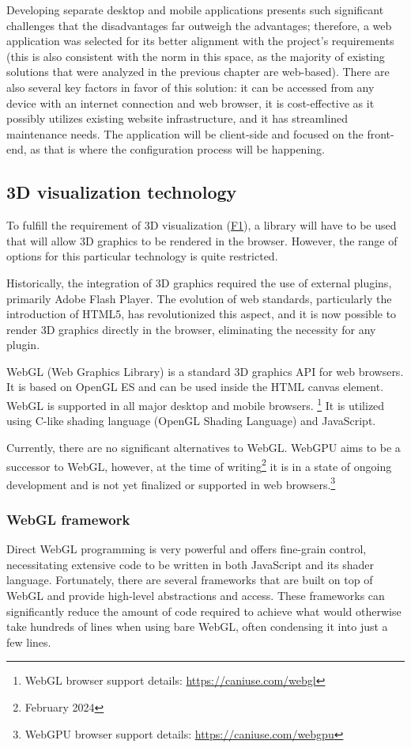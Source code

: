 Developing separate desktop and mobile applications presents such significant challenges that the disadvantages far outweigh the advantages; therefore, a web application was selected for its better alignment with the project's requirements (this is also consistent with the norm in this space, as the majority of existing solutions that were analyzed in the previous chapter are web-based). There are also several key factors in favor of this solution: it can be accessed from any device with an internet connection and web browser, it is cost-effective as it possibly utilizes existing website infrastructure, and it has streamlined maintenance needs. The application will be client-side and focused on the front-end, as that is where the configuration process will be happening.



\subsection{3D visualization technology}

To fulfill the requirement of 3D visualization (\hyperref[itm:F1]{F1}), a library will have to be used that will allow 3D graphics to be rendered in the browser. However, the range of options for this particular technology is quite restricted.

Historically, the integration of 3D graphics required the use of external plugins, primarily Adobe Flash Player. The evolution of web standards, particularly the introduction of HTML5, has revolutionized this aspect, and it is now possible to render 3D graphics directly in the browser, eliminating the necessity for any plugin. \cite{Parisi2014}

WebGL (Web Graphics Library) is a standard 3D graphics API for web browsers. It is based on OpenGL ES and can be used inside the HTML canvas element. WebGL is supported in all major desktop and mobile browsers. \footnote{WebGL browser support details: \url{https://caniuse.com/webgl}} It is utilized using C-like shading language (OpenGL Shading Language) and JavaScript. \cite{Parisi2012}

Currently, there are no significant alternatives to WebGL. WebGPU aims to be a successor to WebGL, however, at the time of writing\footnote{February 2024} it is in a state of ongoing development and is not yet finalized or supported in web browsers.\footnote{WebGPU browser support details: \url{https://caniuse.com/webgpu}} \cite{WebGPU}

\subsubsection{WebGL framework}
\label{section:WebGL}
Direct WebGL programming is very powerful and offers fine-grain control, necessitating extensive code to be written in both JavaScript and its shader language. Fortunately, there are several frameworks that are built on top of WebGL and provide high-level abstractions and access. These frameworks can significantly reduce the amount of code required to achieve what would otherwise take hundreds of lines when using bare WebGL, often condensing it into just a few lines. \cite{Parisi2014}


